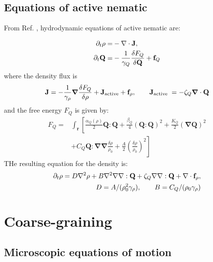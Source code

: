 \documentclass[a5paper]{article}
\begin{document}
\subsection{Equations of active nematic}
From Ref. \cite{marchetti2013hydrodynamics}, hydrodynamic equations of active nematic are:

\begin{align}
\partial_t \rho=&-\nabla \cdot \mathbf{J},
\\
\partial_t \mathbf{Q}=&-\frac{1}{\gamma_Q} \frac{\delta F_Q}{\delta \mathbf{Q}}+\mathbf{f}_Q
\end{align}
where the density flux is
\begin{equation}
\mathbf{J}=-\frac{1}{\gamma_\rho} \boldsymbol{\nabla} \frac{\delta F_Q}{\delta \rho}+\mathbf{J}_{\text {active}}+ \mathbf{f}_\rho, 
\qquad
\mathbf{J}_{\text {active }}=-\zeta_Q \boldsymbol{\nabla} \cdot \mathbf{Q}
\end{equation}
and the free energy $F_Q$ is given by:
\begin{align}
F_Q= & \int_{\mathbf{r}}\left[\frac{\alpha_Q(\rho)}{2} \mathbf{Q}: \mathbf{Q}+\frac{\beta_Q}{4}(\mathbf{Q}: \mathbf{Q})^2+\frac{K_Q}{2}(\boldsymbol{\nabla} \mathbf{Q})^2\right. \\
& \left.+C_Q \mathbf{Q}: \boldsymbol{\nabla} \boldsymbol{\nabla} \frac{\delta \rho}{\rho_0}+\frac{A}{2}\left(\frac{\delta \rho}{\rho_0}\right)^2\right]
\end{align}
THe resulting equation for the density is:
\begin{align}
    \label{density-equation-marchetti}
    \partial_t \rho=D \nabla^2 \rho+B \nabla^2 \nabla \nabla: \mathbf{Q}+\zeta_Q \nabla \nabla: \mathbf{Q}+\nabla \cdot \mathbf{f}_\rho,
    \\
    D=A / (\rho_0^2 \gamma_\rho), \qquad B = C_Q / (\rho_0 \gamma_\rho)
\end{align}

\section{Coarse-graining}
\subsection{Microscopic equations of motion} 
\end{document}
